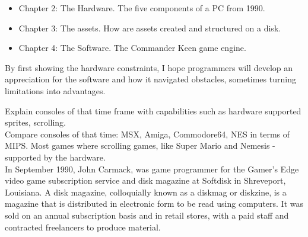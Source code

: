 \documentclass[book.tex]{subfiles}
\begin{document}
\begin{itemize}
  \item Chapter 2: The Hardware. The five components of a PC from 1990.
  \item Chapter 3: The assets. How are assets created and structured on a disk.
  \item Chapter 4: The Software. The Commander Keen game engine.
\end{itemize}
By first showing the hardware constraints, I hope programmers will develop an appreciation for the software and how it navigated obstacles, sometimes turning limitations into advantages.









\label{chapter_console}
Explain consoles of that time frame with capabilities such as hardware supported sprites, scrolling.\\
Compare consoles of that time: MSX, Amiga, Commodore64, NES in terms of MIPS.
Most games where scrolling games, like Super Mario and Nemesis - supported by the hardware.\\


In September 1990, John Carmack, was game programmer for the Gamer's Edge video game subscription service and disk magazine at Softdisk in Shreveport, Louisiana. A disk magazine, colloquially known as a diskmag or diskzine, is a magazine that is distributed in electronic form to be read using computers. It was sold on an annual subscription basis and in retail stores, with a paid staff and contracted freelancers to produce material.
\end{document}
